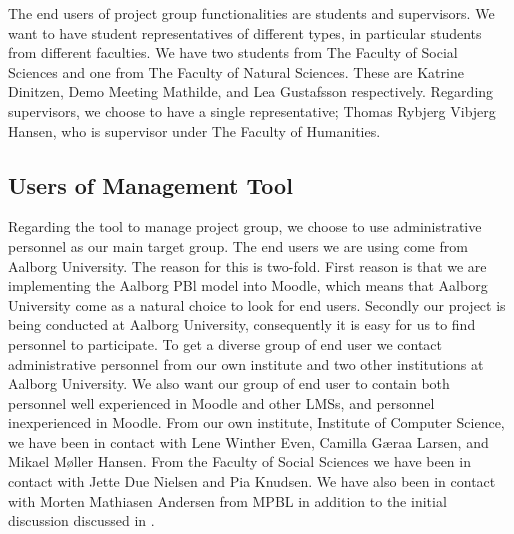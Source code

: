 The end users of project group functionalities are students and supervisors.
We want to have student representatives of different types, in particular students from different faculties.
We have two students from The Faculty of Social Sciences and one from The Faculty of Natural Sciences.
These are Katrine Dinitzen, Demo Meeting Mathilde, and Lea Gustafsson respectively.
Regarding supervisors, we choose to have a single representative; Thomas Rybjerg Vibjerg Hansen, who is supervisor under The Faculty of Humanities.

\subsection{Users of Management Tool}
Regarding the tool to manage project group, we choose to use administrative personnel as our main target group.
The end users we are using come from Aalborg University.
The reason for this is two-fold.
First reason is that we are implementing the Aalborg PBl model into Moodle, which means that Aalborg University come as a natural choice to look for end users.
Secondly our project is being conducted at Aalborg University, consequently it is easy for us to find personnel to participate.
To get a diverse group of end user we contact administrative personnel from our own institute and two other institutions at Aalborg University.
We also want our group of end user to contain both personnel well experienced in Moodle and other LMSs, and personnel inexperienced in Moodle.
From our own institute, Institute of Computer Science, we have been in contact with Lene Winther Even, Camilla G\ae{}raa Larsen, and Mikael M\o{}ller Hansen.
From the Faculty of Social Sciences we have been in contact with  Jette Due Nielsen and Pia Knudsen.
We have also been in contact with Morten Mathiasen Andersen from MPBL in addition to the initial discussion discussed in .